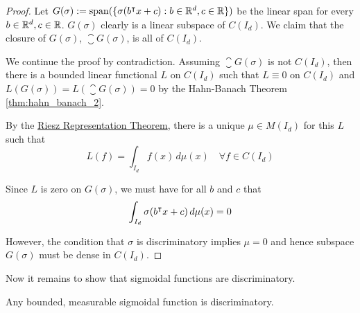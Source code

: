 \begin{proof}
    Let $G(\sigma) := \operatorname{span}(\{\sigma(b{}^{\intercal} x + c): b \in \mathbb{R}^d, c \in \mathbb{R} \})$ be
    the linear span for every $b\in\mathbb{R}^d, c\in\mathbb{R}$. $G(\sigma)$ clearly is a
    linear subspace of $C(I_d)$. We claim that the closure of $G(\sigma)$,
    $\closure{G(\sigma)}$, is all of $C(I_d)$.

    We continue the proof by contradiction. Assuming $\closure{G(\sigma)}$ is
    not $C(I_d)$, then there is a bounded linear functional $L$ on $C(I_d)$ such
    that $L\equiv 0$ on $C(I_d)$ and $L(G(\sigma)) = L(\closure{G(\sigma)}) = 0$
    by the Hahn-Banach Theorem \ref{thm:hahn_banach_2}.

    By the \hyperref[thm:riesz_rep]{Riesz Representation Theorem}, there is a
    unique $\mu \in M(I_d)$ for this $L$ such that
    \begin{equation}
        L(f) = \int_{I_d} f(x) \,d\mu(x) \quad \forall f \in C(I_d)
    \end{equation}

    Since $L$ is zero on $G(\sigma)$, we must have for all $b$ and $c$ that
    \begin{equation}
        \int_{I_d} \sigma(b{}^{\intercal} x + c) \,d\mu(x) = 0
    \end{equation}

    However, the condition that $\sigma$ is discriminatory implies $\mu = 0$ and
    hence subspace $G(\sigma)$ must be dense in $C(I_d)$.
\end{proof}

Now it remains to show that sigmoidal functions are discriminatory.

\begin{lemma}
    Any bounded, measurable sigmoidal function is discriminatory.
\end{lemma}

